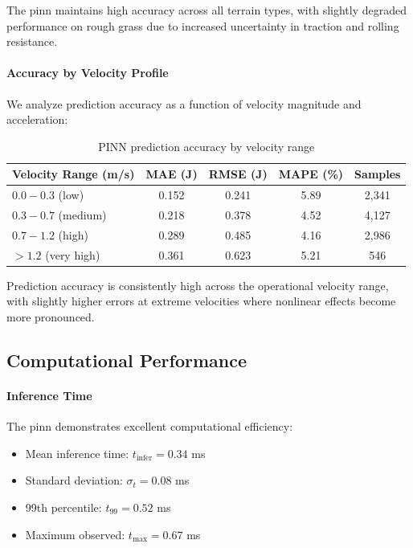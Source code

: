 The \acrshort{pinn} maintains high accuracy across all terrain types, with slightly degraded performance on rough grass due to increased uncertainty in traction and rolling resistance.

\paragraph{Accuracy by Velocity Profile}
We analyze prediction accuracy as a function of velocity magnitude and acceleration:

\begin{table}[htbp]
\centering
\caption{PINN prediction accuracy by velocity range}
\label{tab:pinn_accuracy_velocity}
\begin{tabular}{lcccc}
\toprule
\textbf{Velocity Range (m/s)} & \textbf{MAE (J)} & \textbf{RMSE (J)} & \textbf{MAPE (\%)} & \textbf{Samples} \\
\midrule
$0.0 - 0.3$ (low) & 0.152 & 0.241 & 5.89 & 2,341 \\
$0.3 - 0.7$ (medium) & 0.218 & 0.378 & 4.52 & 4,127 \\
$0.7 - 1.2$ (high) & 0.289 & 0.485 & 4.16 & 2,986 \\
$> 1.2$ (very high) & 0.361 & 0.623 & 5.21 & 546 \\
\bottomrule
\end{tabular}
\end{table}

Prediction accuracy is consistently high across the operational velocity range, with slightly higher errors at extreme velocities where nonlinear effects become more pronounced.


\subsection{Computational Performance}

\paragraph{Inference Time}
The \acrshort{pinn} demonstrates excellent computational efficiency:
\begin{itemize}
    \item Mean inference time: $t_{\text{infer}} = 0.34$ ms
    \item Standard deviation: $\sigma_t = 0.08$ ms
    \item 99th percentile: $t_{99} = 0.52$ ms
    \item Maximum observed: $t_{\max} = 0.67$ ms
\end{itemize}

